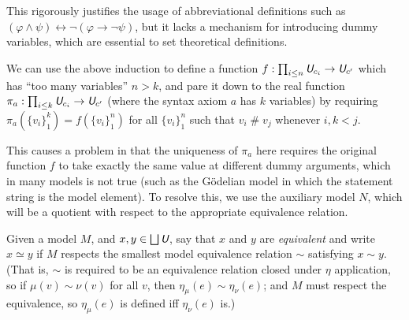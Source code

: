 \documentclass[runningheads,a4paper]{llncs}
\newcommand{\uv}{\textit{\textsf{U}}} %
\newcommand{\vph}{\varphi}
\newcommand{\fresh}{\mathbin{\#}}
\begin{document}
This rigorously justifies the usage of abbreviational definitions such as $(\vph\land\psi)\leftrightarrow\lnot(\vph\to\lnot\psi)$, but it lacks a mechanism for introducing dummy variables, which are essential to set theoretical definitions.

We can use the above induction to define a function $f:\prod_{i\le n}\uv_{c_i}\to\uv_{c'}$ which has ``too many variables'' $n>k$, and pare it down to the real function $\pi_a:\prod_{i\le k}\uv_{c_i}\to\uv_{c'}$ (where the syntax axiom $a$ has $k$ variables) by requiring $\pi_a(\{v_i\}_1^k)=f(\{v_i\}_1^n)$ for all $\{v_i\}_1^n$ such that $v_i\fresh v_j$ whenever $i,k<j$.

This causes a problem in that the uniqueness of $\pi_a$ here requires the original function $f$ to take exactly the same value at different dummy arguments, which in many models is not true (such as the G\"{o}delian model in which the statement string is the model element). To resolve this, we use the auxiliary model $N$, which will be a quotient with respect to the appropriate equivalence relation.

\begin{definition}\label{def:equiv}
Given a model $M$, and $x,y\in\bigsqcup\uv$, say that $x$ and $y$ are {\em equivalent} and write $x\simeq y$ if $M$ respects the smallest model equivalence relation $\sim$ satisfying $x\sim y$. (That is, $\sim$ is required to be an equivalence relation closed under $\eta$ application, so if $\mu(v)\sim\nu(v)$ for all $v$, then $\eta_\mu(e)\sim\eta_\nu(e)$; and $M$ must respect the equivalence, so $\eta_\mu(e)$ is defined iff $\eta_\nu(e)$ is.)
\end{definition}
\end{document}
